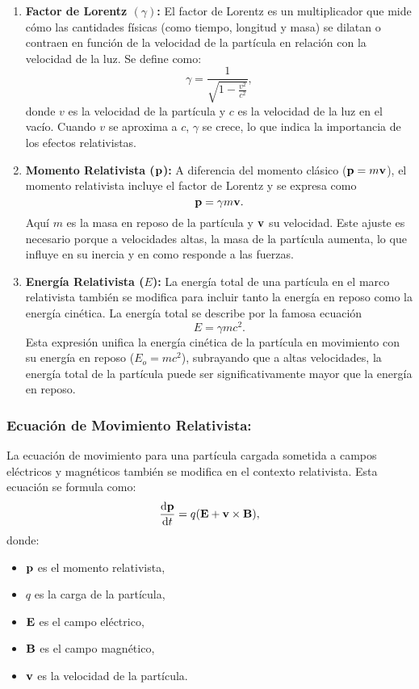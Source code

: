 \begin{enumerate}
    \item \textbf{Factor de Lorentz $(\gamma)$:} El factor de Lorentz es un multiplicador que mide cómo las cantidades físicas (como tiempo, longitud y masa) se dilatan o contraen en función de la velocidad de la partícula en relación con la velocidad de la luz. Se define como:
        \begin{equation}
            \gamma = \frac{1}{\sqrt{1 - \frac{v^2}{c^2}}}, \label{factLorentz}
        \end{equation}
    donde $v$ es la velocidad de la partícula y $c$ es la velocidad de la luz en el vacío. Cuando $v$ se aproxima a $c$, $\gamma$ se crece, lo que indica la importancia de los efectos relativistas.
    \item \textbf{Momento Relativista ($\vb{p}$): } A diferencia del momento clásico ($\vb{p} = m\vb{v}$), el momento relativista incluye el factor de Lorentz y se expresa como
        \begin{equation}
            \vb{p} = \gamma m\vb{v}. \label{momentum}
        \end{equation}
    Aquí $m$ es la masa en reposo de la partícula y $\vb{v}$ su velocidad. Este ajuste es necesario porque a velocidades altas, la masa de la partícula aumenta, lo que influye en su inercia y en como responde a las fuerzas.
    \item \textbf{Energía Relativista ($E$): } La energía total de una partícula en el marco relativista también se modifica para incluir tanto la energía en reposo como la energía cinética. La energía total se describe por la famosa ecuación
        \begin{equation}
            E = \gamma mc^2 . \label{energia}
        \end{equation}
    Esta expresión unifica la energía cinética de la partícula en movimiento con su energía en reposo ($E_o = mc^2$), subrayando que a altas velocidades, la energía total de la partícula puede ser significativamente mayor que la energía en reposo.
\end{enumerate}

\subsubsection*{Ecuación de Movimiento Relativista: } 

La ecuación de movimiento para una partícula cargada sometida a campos eléctricos y magnéticos también se modifica en el contexto relativista. Esta ecuación se formula como:
\begin{equation}
    \dv{\vb{p}}{t} = q(\vb{E} + \vb{v} \times \vb{B}),
\end{equation}
donde:
\begin{itemize}
    \item $\vb{p}$ es el momento relativista,
    \item $q$ es la carga de la partícula,
    \item $\vb{E}$ es el campo eléctrico,
    \item $\vb{B}$ es el campo magnético,
    \item $\vb{v}$ es la velocidad de la partícula.
\end{itemize}


